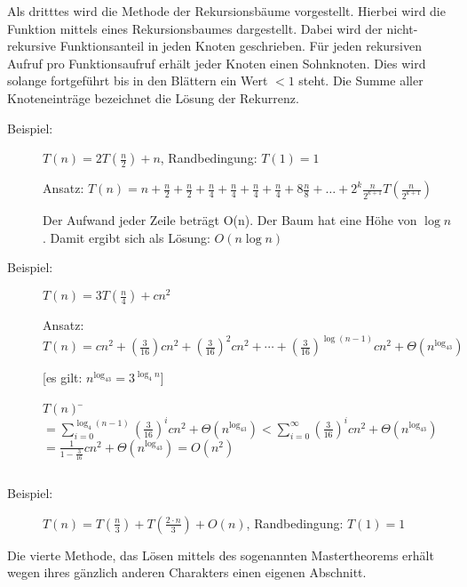\documentclass[ngerman,draft,parskip=half*,twoside]{scrreprt}
\theoremstyle{break}
\begin{document}
Als dritttes wird die Methode der Rekursionsbäume vorgestellt.
Hierbei wird die Funktion mittels eines Rekursionsbaumes dargestellt. Dabei wird der nicht-rekursive Funktionsanteil in jeden Knoten
geschrieben. Für jeden rekursiven Aufruf pro Funktionsaufruf erhält jeder Knoten einen Sohnknoten. Dies wird solange fortgeführt bis
in den Blättern ein Wert $< 1$ steht. Die Summe aller Knoteneinträge bezeichnet die Lösung der Rekurrenz.
	\begin{description}
		\item [Beispiel:] $T(n) = 2 T\left(\frac{n}{2}\right) + n$, Randbedingung: $T(1)=1$
			
		Ansatz: $T(n) = n + \frac{n}{2} + \frac{n}{2} + \frac{n}{4} + \frac{n}{4} + \frac{n}{4} + \frac{n}{4} + 8 \frac{n}{8} + 
		\ldots + {2^k} \frac{n}{2^{k+1}} T\left(\frac{n}{2^{k+1}}\right)$
			
		
			
		Der Aufwand jeder Zeile beträgt O(n). Der Baum hat eine Höhe von $\log n$. Damit ergibt sich als Lösung: 
		$O(n \log n)$			
		
		\item [Beispiel:] $T(n) = 3 T(\frac{n}{4}) + c n^2$
						
		Ansatz: $T(n) = c n^2 + \left(\frac{3}{16} \right) c n^2 + \left(\frac{3}{16}\right)^2 c n^2 + \cdots +
		\left(\frac{3}{16}\right)^{\log \left(n-1\right)} c n^2 + \Theta\left(n^{\log_43}\right)$
			
		[es gilt: $n^{\log_43}=3^{\log_4n}$]
			\begin{tabbing}
				$T(n)$ \= $= \sum_{i=0}^{\log_4\left(n-1\right)}\left(\frac{3}{16}\right)^i c n^2+ \Theta\left(n^{\log_43}\right) 
				< \sum_{i=0}^{\infty}\left(\frac{3}{16}\right)^i c n^2 + \Theta(n^{\log_43})$\\
				\> $= \frac{1}{1-\frac{3}{16}} c n^2 + \Theta(n^{\log_43})=O(n^2)$
			\end{tabbing}			
		$  $
	\end{description}
		
\begin{description}
	\item [Beispiel:] $T(n) = T\left(\frac{n}{3}\right) + T\left(\frac{2\cdot n}{3}\right) + O(n)$, Randbedingung: $T(1)=1$
	$  $
	\end{description}		
%
Die vierte Methode, das Lösen mittels des sogenannten Mastertheorems erhält wegen ihres gänzlich anderen Charakters einen eigenen
Abschnitt.
%
\end{document}
